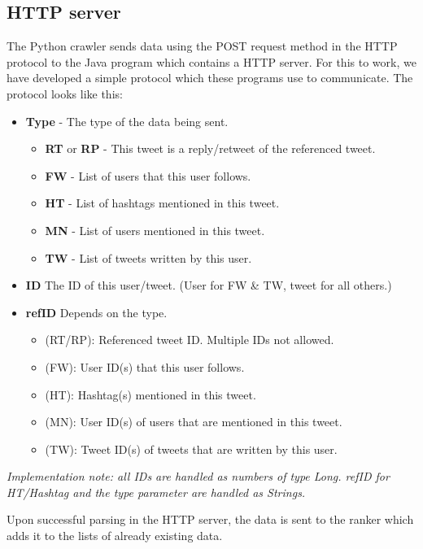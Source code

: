\subsection{HTTP server}

The Python crawler sends data using the POST request method in the HTTP protocol to the Java program which contains a HTTP server. For this to work, we have developed a simple protocol which these programs use to communicate. The protocol looks like this:

\begin{itemize}
	\item \textbf{Type} - The type of the data being sent.
	\begin{itemize}
		\item \textbf{RT} or \textbf{RP} - This tweet is a reply/retweet of the referenced tweet.
		\item \textbf{FW} - List of users that this user follows.
		\item \textbf{HT} - List of hashtags mentioned in this tweet.
		\item \textbf{MN} - List of users mentioned in this tweet.
		\item \textbf{TW} - List of tweets written by this user.
	\end{itemize}
	\item \textbf{ID} The ID of this user/tweet. (User for FW \& TW, tweet for all others.)
	\item \textbf{refID} Depends on the type.
	\begin{itemize}
		\item[] (RT/RP): Referenced tweet ID. Multiple IDs not allowed.
		\item[] (FW): User ID(s) that this user follows.
		\item[] (HT): Hashtag(s) mentioned in this tweet.
		\item[] (MN): User ID(s) of users that are mentioned in this tweet.
		\item[] (TW): Tweet ID(s) of tweets that are written by this user.
	\end{itemize}
\end{itemize}

\textit{Implementation note: all IDs are handled as numbers of type Long. refID for HT/Hashtag and the type parameter are handled as Strings.}

Upon successful parsing in the HTTP server, the data is sent to the ranker which adds it to the lists of already existing data.